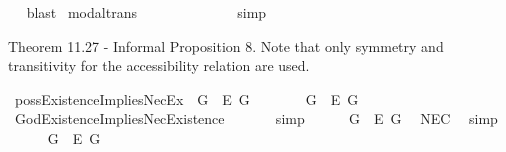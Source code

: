 \begin{isabellebody}
\isadelimproof
\ %
\endisadelimproof
%
\isatagproof
{}\isamarkupfalse%
\ blast%
\endisatagproof
{\isafoldproof}%
%
\isadelimproof
%
\endisadelimproof
\isanewline
{}\isamarkupfalse%
\ modal{\isacharunderscore}trans{\isacharcolon}\ {\isachardoublequoteopen}{\isacharparenleft}{\isasymlfloor}{\isasymphi}\ \isactrlbold {\isasymrightarrow}\ {\isasympsi}{\isasymrfloor}\ {\isasymand}\ {\isasymlfloor}{\isasympsi}\ \isactrlbold {\isasymrightarrow}\ {\isasymchi}{\isasymrfloor}{\isacharparenright}\ {\isasymLongrightarrow}\ {\isasymlfloor}{\isasymphi}\ \isactrlbold {\isasymrightarrow}\ {\isasymchi}{\isasymrfloor}{\isachardoublequoteclose}%
\isadelimproof
\ %
\endisadelimproof
%
\isatagproof
{}\isamarkupfalse%
\ simp%
\endisatagproof
{\isafoldproof}%
%
\isadelimproof
%
\endisadelimproof
%
\begin{isamarkuptext}%
Theorem 11.27 - Informal Proposition 8. Note that only symmetry and transitivity for the accessibility relation are used.%
\end{isamarkuptext}\isamarkuptrue%
\isamarkupfalse%
\ possExistenceImpliesNecEx{\isacharcolon}\ {\isachardoublequoteopen}{\isasymlfloor}\isactrlbold {\isasymdiamond}\isactrlbold {\isasymexists}\ G\ \isactrlbold {\isasymrightarrow}\ \isactrlbold {\isasymbox}\isactrlbold {\isasymexists}\isactrlsup E\ G{\isasymrfloor}{\isachardoublequoteclose}\ %
\isanewline
%
\isadelimproof
%
\endisadelimproof
%
\isatagproof
{}\isamarkupfalse%
\ {\isacharminus}\isanewline
\ \ \isamarkupfalse%
\ {\isachardoublequoteopen}{\isasymlfloor}\isactrlbold {\isasymexists}\ G\ \isactrlbold {\isasymrightarrow}\ \isactrlbold {\isasymbox}\isactrlbold {\isasymexists}\isactrlsup E\ G{\isasymrfloor}{\isachardoublequoteclose}\ \isamarkupfalse%
\ GodExistenceImpliesNecExistence\ \isanewline
\ \ \ \ \isamarkupfalse%
\ simp\ %
\isanewline
\ \ \isamarkupfalse%
\ {\isachardoublequoteopen}{\isasymlfloor}\isactrlbold {\isasymbox}{\isacharparenleft}\isactrlbold {\isasymexists}\ G\ \isactrlbold {\isasymrightarrow}\ \isactrlbold {\isasymbox}\isactrlbold {\isasymexists}\isactrlsup E\ G{\isacharparenright}{\isasymrfloor}{\isachardoublequoteclose}\ \isamarkupfalse%
\ NEC\ \isamarkupfalse%
\ simp\isanewline
\ \ \isamarkupfalse%
\ {}{\isacharcolon}\ {\isachardoublequoteopen}{\isasymlfloor}\isactrlbold {\isasymdiamond}\isactrlbold {\isasymexists}\ G\ \isactrlbold {\isasymrightarrow}\ \isactrlbold {\isasymdiamond}\isactrlbold {\isasymbox}\isactrlbold {\isasymexists}\isactrlsup E\ G{\isasymrfloor}{\isachardoublequoteclose}\ \isamarkupfalse%

\end{isabellebody}
